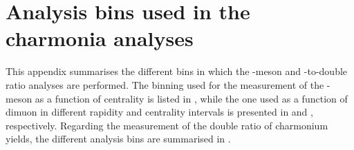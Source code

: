 \chapter{Analysis bins used in the charmonia analyses}\label{app:Charmonia_Binning}

This appendix summarises the different bins in which the \JPsi-meson \raa and \PsiP-to-\JPsi double ratio analyses are performed. The binning used for the measurement of the \JPsi-meson \raa as a function of centrality is listed in , while the one used as a function of dimuon \pt in different rapidity and centrality intervals is presented in  and , respectively. Regarding the measurement of the double ratio of charmonium yields, the different analysis bins are summarised in .

